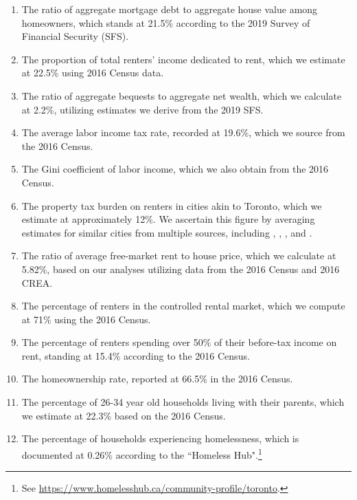 \documentclass[parskip=full]{article}
\begin{document}
\begin{enumerate}
    \item The ratio of aggregate mortgage debt to aggregate house value among homeowners, which stands at 21.5\% according to the 2019 Survey of Financial Security (SFS).
    \item The proportion of total renters' income dedicated to rent, which we estimate at 22.5\% using 2016 Census data.
    \item The ratio of aggregate bequests to aggregate net wealth, which we calculate at 2.2\%, utilizing estimates we derive from the 2019 SFS.
    \item The average labor income tax rate, recorded at 19.6\%, which we source from the 2016 Census.
    \item The Gini coefficient of labor income, which we also obtain from the 2016 Census.
    \item The property tax burden on renters in cities akin to Toronto, which we estimate at approximately 12\%. We ascertain this figure by averaging estimates for similar cities from multiple sources, including \citet{cy-1994}, \citet{susin-2002}, \citet{fack-2006}, and \citet{sy-2020}.
    \item The ratio of average free-market rent to house price, which we calculate at 5.82\%, based on our analyses utilizing data from the 2016 Census and 2016 CREA.
    \item The percentage of renters in the controlled rental market, which we compute at 71\% using the 2016 Census. 
    \item The percentage of renters spending over 50\% of their before-tax income on rent, standing at 15.4\% according to the 2016 Census.
    \item The homeownership rate, reported at 66.5\% in the 2016 Census.
    \item The percentage of 26-34 year old households living with their parents, which we estimate at 22.3\% based on the 2016 Census.
    \item The percentage of households experiencing homelessness, which is documented at 0.26\% according to the ``Homeless Hub".\footnote{See \url{https://www.homelesshub.ca/community-profile/toronto}.}
\end{enumerate}
\end{document}
